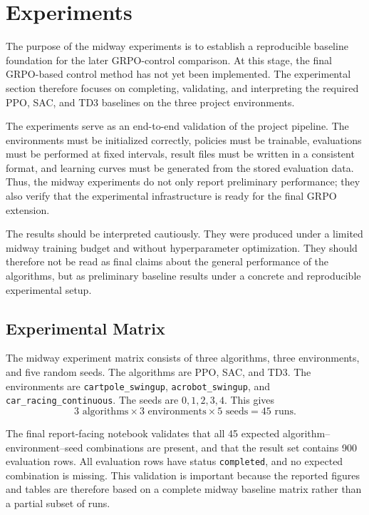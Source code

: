 
\section{Experiments}
\label{sec:experiments}

The purpose of the midway experiments is to establish a reproducible baseline foundation for the later GRPO-control comparison. At this stage, the final GRPO-based control method has not yet been implemented. The experimental section therefore focuses on completing, validating, and interpreting the required PPO, SAC, and TD3 baselines on the three project environments.

The experiments serve as an end-to-end validation of the project pipeline. The environments must be initialized correctly, policies must be trainable, evaluations must be performed at fixed intervals, result files must be written in a consistent format, and learning curves must be generated from the stored evaluation data. Thus, the midway experiments do not only report preliminary performance; they also verify that the experimental infrastructure is ready for the final GRPO extension.

The results should be interpreted cautiously. They were produced under a limited midway training budget and without hyperparameter optimization. They should therefore not be read as final claims about the general performance of the algorithms, but as preliminary baseline results under a concrete and reproducible experimental setup.

\subsection{Experimental Matrix}
\label{sec:experimental-matrix}

The midway experiment matrix consists of three algorithms, three environments, and five random seeds. The algorithms are PPO, SAC, and TD3. The environments are \texttt{cartpole\_swingup}, \texttt{acrobot\_swingup}, and \texttt{car\_racing\_continuous}. The seeds are $0,1,2,3,4$. This gives
\[
3 \text{ algorithms} \times 3 \text{ environments} \times 5 \text{ seeds}
=
45 \text{ runs}.
\]

The final report-facing notebook validates that all 45 expected algorithm--environment--seed combinations are present, and that the result set contains 900 evaluation rows. All evaluation rows have status \texttt{completed}, and no expected combination is missing. This validation is important because the reported figures and tables are therefore based on a complete midway baseline matrix rather than a partial subset of runs.

